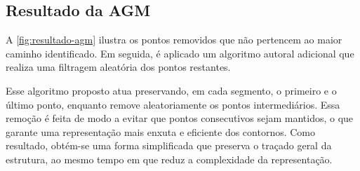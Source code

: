 \subsection{Resultado da AGM}
\label{sec:resultado-agm}

A \autoref{fig:resultado-agm} ilustra os pontos removidos que não pertencem ao maior caminho identificado. Em seguida, é aplicado um algoritmo autoral adicional que realiza uma filtragem aleatória dos pontos restantes.

Esse algoritmo proposto atua preservando, em cada segmento, o primeiro e o último ponto, enquanto remove aleatoriamente os pontos intermediários. Essa remoção é feita de modo a evitar que pontos consecutivos sejam mantidos, o que garante uma representação mais enxuta e eficiente dos contornos. Como resultado, obtém-se uma forma simplificada que preserva o traçado geral da estrutura, ao mesmo tempo em que reduz a complexidade da representação.

